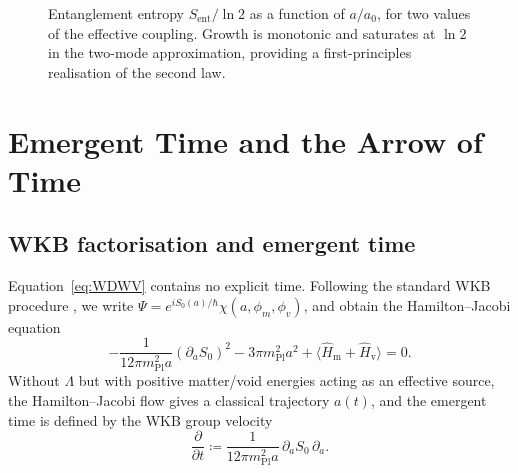 \documentclass[12pt,a4paper]{article}
\theoremstyle{plain}
\theoremstyle{definition}
\newcommand{\Hm}{\hat{H}_{\mathrm{m}}}
\newcommand{\Hv}{\hat{H}_{\mathrm{v}}}
\newcommand{\Mpl}{m_{\mathrm{Pl}}}
\newcommand{\Sent}{S_{\mathrm{ent}}}
\newcommand{\defeq}{\coloneqq}
\begin{document}
\begin{figure}[t]
\centering
{}
\caption{Entanglement entropy $\Sent/\ln 2$ as a function of $a/a_0$,
for two values of the effective coupling.
Growth is monotonic and saturates at $\ln 2$ in the two-mode approximation,
providing a first-principles realisation of the second law.}
\label{fig:entropy}
\end{figure}

\section{Emergent Time and the Arrow of Time}
\label{sec:time}

\subsection{WKB factorisation and emergent time}

Equation~\eqref{eq:WDWV} contains no explicit time.
Following the standard WKB procedure \cite{HalliwellHawking1985,Banks1985},
we write $\Psi = e^{iS_0(a)/\hbar}\chi(a,\phi_m,\phi_v)$, and obtain the
Hamilton--Jacobi equation
\begin{equation}
  -\frac{1}{12\pi\Mpl^2 a}(\partial_a S_0)^2
  - 3\pi\Mpl^2 a^2
  + \langle\Hm + \Hv\rangle = 0.
  \label{eq:HJ}
\end{equation}
Without $\Lambda$ but with positive matter/void energies acting as an
effective source, the Hamilton--Jacobi flow gives a classical trajectory
$a(t)$, and the emergent time is defined by the WKB group velocity
\begin{equation}
  \frac{\partial}{\partial t}
  \defeq \frac{1}{12\pi\Mpl^2 a}\,\partial_a S_0\,\partial_a.
  \label{eq:emergent_time}
\end{equation}
\end{document}
